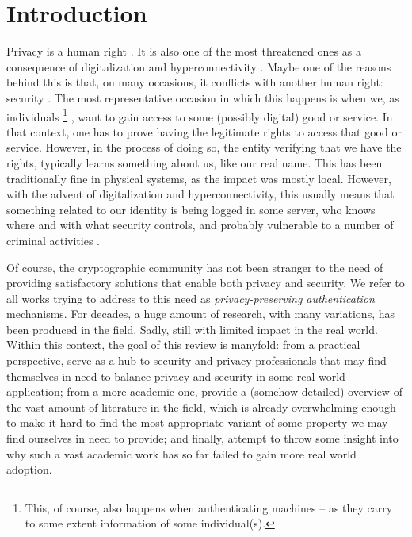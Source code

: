 \section{Introduction}
\label{sec:introduction}

Privacy is a human right \needcite. It is also one of the most threatened ones
as a consequence of digitalization and hyperconnectivity \needcite. Maybe one
of the reasons behind this is that, on many occasions, it conflicts with another
human right: security \needcite. The most representative occasion in which this
happens is when we, as individuals%
\footnote{This, of course, also happens when authenticating machines -- as they
  carry to some extent information of some individual(s).}%
, want to gain access to some (possibly
digital) good or service. In that context, one has to prove having the legitimate
rights to access that good or service. However, in the process of doing so, the
entity verifying that we have the rights, typically learns something about us,
like our real name. This has been traditionally fine in physical systems, as the
impact was mostly local. However, with the advent of digitalization and
hyperconnectivity, this usually means that something related to our identity is
being logged in some server, who knows where and with what security controls,
and probably vulnerable to a number of criminal activities \needcite.

Of course, the cryptographic community has not been stranger to the need of
providing satisfactory solutions that enable both privacy and security. We
refer to all works trying to address to this need as \emph{privacy-preserving
  authentication} mechanisms. For decades, a huge amount of research, with many
variations, has been produced in the field. Sadly, still with limited impact in
the real world. Within this context, the goal of this review is manyfold: from a
practical perspective, serve
as a hub to security and privacy professionals that may find themselves in need
to balance privacy and security in some real world application; from a more
academic one, provide a (somehow detailed) overview of the vast amount of
literature in the field, which is already overwhelming enough to make it hard
to find the most appropriate variant of some property we may find ourselves
in need to provide; and finally, attempt to throw some insight into why such a
vast academic work has so far failed to gain more real world adoption.

